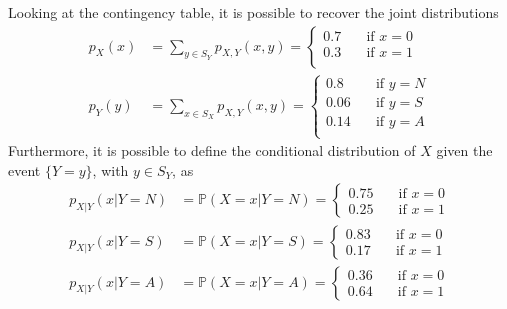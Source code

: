 \documentclass{report}
\begin{document}
\begin{examplebox}
    \noindent Looking at the contingency table, it is possible to recover the joint distributions
    \begin{align*}
        p_X(x) &= \sum_{y \in S_Y} p_{X, Y}(x, y) = \begin{cases}
            0.7 &\quad\text{if $x = 0$} \\
            0.3 &\quad\text{if $x = 1$} \\
        \end{cases} \\
        p_Y(y) &= \sum_{x \in S_X} p_{X, Y}(x, y) = \begin{cases}
            0.8 &\quad\text{if $y = N$} \\
            0.06 &\quad\text{if $y = S$} \\
            0.14 &\quad\text{if $y = A$} \\
        \end{cases}
    \end{align*}
    Furthermore, it is possible to define the conditional distribution of $\displaystyle X$ given the event $\displaystyle \{Y = y\}$, with $\displaystyle y \in S_Y$, as
    \begin{align*}
        p_{X|Y}(x|Y = N) &= \mathbb{P}(X = x|Y = N) = \begin{cases}
            0.75 &\quad\text{if $x = 0$} \\
            0.25 &\quad\text{if $x = 1$}
        \end{cases} \\
        p_{X|Y}(x|Y = S) &= \mathbb{P}(X = x|Y = S) = \begin{cases}
            0.83 &\quad\text{if $x = 0$} \\
            0.17 &\quad\text{if $x = 1$}
        \end{cases} \\
        p_{X|Y}(x|Y = A) &= \mathbb{P}(X = x|Y = A) = \begin{cases}
            0.36 &\quad\text{if $x = 0$} \\
            0.64 &\quad\text{if $x = 1$}
        \end{cases}
    \end{align*}
\end{examplebox}
\end{document}
